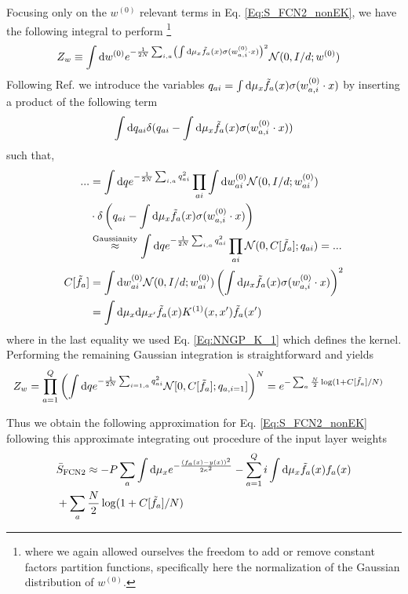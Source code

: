 Focusing only on the ${w}^{(0)}$ relevant terms in Eq. \ref{Eq:S_FCN2_nonEK}, we have the following integral to perform \footnote{where we again allowed ourselves the freedom to add or remove constant factors partition functions, specifically here the normalization of the Gaussian distribution of ${w}^{(0)}$.}
\begin{align}
Z_w &\equiv \int \text{d} {w}^{(0)} e^{-\frac{1}{2N} \sum_{i,a} \left(\int \text{d}\mu_x \tilde{f}_a(x) \sigma({w}^{(0)}_{a,i} \cdot {x})\right)^2} {\cal N}(0,I/d;{w}^{(0)})
\end{align}
Following Ref. \cite{ariosto2022statistical} we 
introduce the variables $q_{ai}=\int \text{d} \mu_x \tilde{f}_a(x) \sigma({w}^{(0)}_{a,i} \cdot {x})$ by inserting a product of the following term$$\int \text{d} q_{ai} \delta(q_{ai}-\int \text{d}\mu_x \tilde{f}_a(x) \sigma({w}^{(0)}_{a,i} \cdot {x}))$$ such that,
\begin{align}
... &= \int \text{d} q  e^{-\frac{1}{2N} \sum_{i,a} q^2_{ai}} \prod_{ai} \int \text{d}{w}_{ai}^{(0)} {\cal N}(0,I/d;{w}_{ai}^{(0)})
\\ \nonumber 
&\cdot \delta\left(q_{ai}-\int \text{d}\mu_x \tilde{f}_a(x) \sigma({w}^{(0)}_{a,i} \cdot {x})\right) \\ \nonumber 
&\stackrel{\text{Gaussianity}}{\approx} \int \text{d} q  e^{-\frac{1}{2N} \sum_{i,a} q^2_{ai}} \prod_{ai} {\cal N}(0,C[\tilde{f}_a];q_{ai}) = ... \\ \nonumber 
C[\tilde{f}_a] &= \int  \text{d} {w}_{ai}^{(0)} {\cal N}(0,I/d;{w}_{ai}^{(0)})\left(\int  \text{d}\mu_x \tilde{f}_a(x) \sigma({w}^{(0)}_{a,i} \cdot {x})\right)^2 \\ \nonumber 
&= \int  \text{d}\mu_x  \text{d}\mu_{x'} \tilde{f}_a(x) K^{(1)}(x,x') \tilde{f}_a(x')
\end{align}
where in the last equality we used Eq. \ref{Eq:NNGP_K_1} which defines the kernel. Performing the remaining Gaussian integration is straightforward and yields 
\begin{align}
Z_w &= \prod_{a=1}^Q \left(\int \text{d} q  e^{-\frac{1}{2N} \sum_{i=1,a} q^2_{ai}} {\cal N}[0,C[\tilde{f}_a];q_{a,i=1}]\right)^N = e^{-\sum_a\frac{N}{2}\log(1+C[\tilde{f}_a]/N)}
\end{align}

Thus we obtain the following approximation for Eq. \ref{Eq:S_FCN2_nonEK} following this approximate integrating out procedure of the input layer weights  
\begin{align}
&\bar{S}_{\text{FCN2}} \approx -P\sum_a \int \text{d} \mu_x e^{-\frac{(f_a(x)-y(x))^2}{2\kappa^2}} - \sum_{a=1}^Q i\int \text{d}\mu_x \tilde{f}_a(x) f_a(x) \\ \nonumber 
&+\sum_a\frac{N}{2}\log(1+C[\tilde{f}_a]/N)
\end{align}

